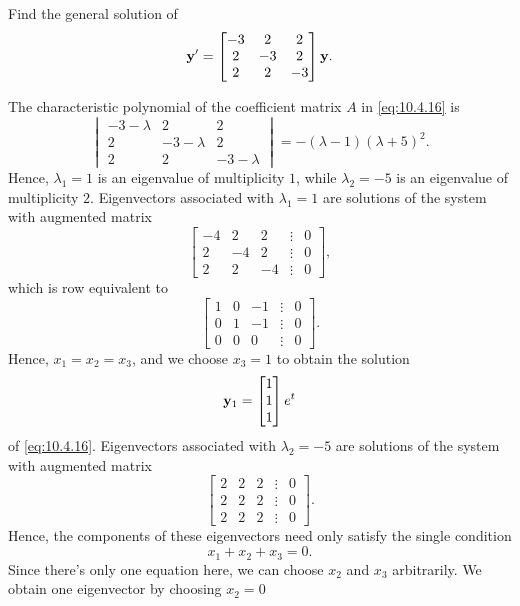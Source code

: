 \documentclass{ximera}
\begin{document}
\begin{example}\label{example:10.4.3}
 Find the general solution of
\begin{equation}\label{eq:10.4.16}
{\bf y}'=\begin{bmatrix}-3&2&2\\
2&-3&2\\2&2&-3
\end{bmatrix}{\bf y}.
\end{equation}


\begin{explanation} The characteristic polynomial of
the  coefficient matrix $A$ in  \eqref{eq:10.4.16} is
$$
\begin{vmatrix}-3-\lambda&2&2\\2&-3-\lambda&2\\2&2
&-3-\lambda\end{vmatrix}=-(\lambda-1)(\lambda+5)^2.
$$
Hence, $\lambda_1=1$ is an eigenvalue of multiplicity $1$, while
$\lambda_2=-5$ is an eigenvalue of multiplicity $2$. Eigenvectors
associated with $\lambda_1=1$ are solutions of the system with
augmented matrix
$$
\begin{bmatrix}-4&2&2&\vdots&0\\
2
&-4&2&\vdots&0\\2&2&-4&
\vdots&0\end{bmatrix}, $$
which is row equivalent to
$$
\begin{bmatrix} 1&0&-1&\vdots& 0\\0&1&-1 &\vdots& 0
\\0&0&0&\vdots&0\end{bmatrix}.
$$
Hence, $x_1=x_2=x_3$, and we choose $x_3=1$ to obtain the solution
\begin{equation}\label{eq:10.4.17}
{\bf y}_1=\begin{bmatrix}1\\1\\1\end{bmatrix}e^t
\end{equation}
of  \eqref{eq:10.4.16}.  Eigenvectors associated with $\lambda_2=-5$
are solutions of the system
with  augmented matrix
$$
\begin{bmatrix} 2&2&2&\vdots&0\\2&2&2&\vdots&0
\\2&2&2&\vdots&0\end{bmatrix}.
$$
Hence, the components of these eigenvectors need only satisfy the single
condition
$$
x_1+x_2+x_3=0.
$$
Since there's only one equation here, we can choose $x_2$ and
$x_3$  arbitrarily. We obtain one eigenvector by choosing $x_2=0$

\end{explanation}
\end{example}
\end{document}
